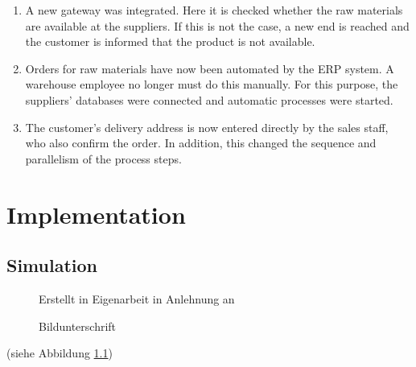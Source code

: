     \begin{enumerate}
        \item A new gateway was integrated. Here it is checked whether the raw materials are available at the suppliers. If this is not the case, a new end is reached and the customer is informed that the product is not available.
        \item Orders for raw materials have now been automated by the ERP system. A warehouse employee no longer must do this manually. For this purpose, the suppliers' databases were connected and automatic processes were started.
        \item The customer's delivery address is now entered directly by the sales staff, who also confirm the order. In addition, this changed the sequence and parallelism of the process steps.
    \end{enumerate}
\clearpage
\chapter{Implementation}

    \section{Simulation}
    \begin{figure}[H]
        \centering
        \caption{Bildunterschrift}
        \label{soqu3}
        \small{Erstellt in Eigenarbeit in Anlehnung an \cite[see][]{us2020}}
    \end{figure}
    \blindtext (siehe Abbildung \ref{soqu3})

